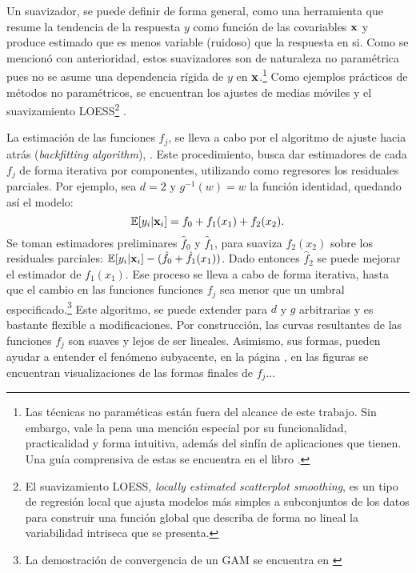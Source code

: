 \documentclass[../Main/Main.tex]{subfiles}
\begin{document}
Un suavizador, se puede definir de forma general, como una herramienta que resume la tendencia de la respuesta $y$ como función de las covariables $\mathbf{x}$ y produce estimado que es menos variable (ruidoso) que la respuesta en si. Como se mencionó con anterioridad, estos suavizadores son de naturaleza no paramétrica pues no se asume una dependencia rígida de $y$ en $\mathbf{x}$.\footnote{Las técnicas no paraméticas están fuera del alcance de este trabajo. Sin embargo, vale la pena una mención especial por su funcionalidad, practicalidad y forma intuitiva, además del sinfín de aplicaciones que tienen. Una guía comprensiva de estas se encuentra en el libro \citet{wasserman2007all}.} Como ejemplos prácticos de métodos no paramétricos, se encuentran los ajustes de medias móviles y el suavizamiento LOESS\footnote{El suavizamiento LOESS, \textit{locally estimated scatterplot smoothing}, es un tipo de regresión local que ajusta modelos más simples a subconjuntos de los datos para construir una función global que describa de forma no lineal la variabilidad intriseca que se presenta.} \autocite{cleveland1988locally}. 

La estimación de las funciones $f_j$, se lleva a cabo por el algoritmo de ajuste hacia atrás (\textit{backfitting algorithm}), \citet{hastie1986generalized}. Este procedimiento, busca dar estimadores de cada $f_j$ de forma iterativa por componentes, utilizando como regresores los residuales parciales. Por ejemplo, sea $d = 2$ y $g^{-1}(w) = w$ la función identidad, quedando así el modelo:
$$\mathbb{E}[y_i|\mathbf{x}_i] = f_0 + f_1(x_1) + f_2(x_2).$$
Se toman estimadores preliminares $\hat{f}_0$ y $\hat{f}_1$, para suaviza $f_2(x_2)$ sobre los residuales parciales: $\mathbb{E}[y_i|\mathbf{x}_i] - (\hat{f}_0 + \hat{f}_1(x_1))$. Dado entonces $\hat{f}_2$ se puede mejorar el estimador de $f_1(x_1)$. Ese proceso se lleva a cabo de forma iterativa, hasta que el cambio en las funciones funciones $f_j$  sea menor que un umbral especificado.\footnote{La demostración de convergencia de un GAM se encuentra en \citet{stone1985additive}} Este algoritmo, se puede extender para $d$ y $g$ arbitrarias y es bastante flexible a modificaciones. Por construcción, las curvas resultantes de las funciones $f_j$ son suaves y lejos de ser lineales. Asimismo, sus formas, pueden ayudar a entender el fenómeno subyacente, en la página \pageref{}, en las figuras \pageref{} se encuentran visualizaciones de las formas finales de $f_j$...  
\end{document}
